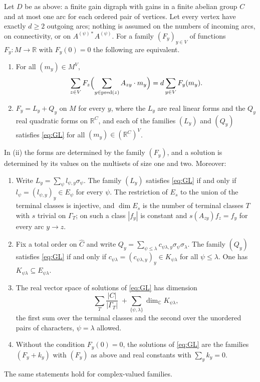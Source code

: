 \begin{theorem}\label{thm:vertexlaw}
Let $D$ be as above: a finite gain digraph with gains in a finite abelian group $C$ and at most one arc for each ordered pair of vertices. Let every vertex have exactly $d\ge2$ outgoing arcs; nothing is assumed on the numbers of incoming arcs, on connectivity, or on $A^{(\psi)*}A^{(\psi)}$. For a family $(F_y)_{y\in V}$ of functions $F_y\colon M\to\mathbb{R}$ with $F_y(0)=0$ the following are equivalent.
\begin{enumerate}
\item[(i)] For all $(m_y)\in M^V$,
\begin{equation}\label{eq:GL}
\sum_{z\in V}F_z\Bigl(\sum_{y\in\operatorname{pred}(z)}A_{zy}\cdot m_y\Bigr)=d\sum_{y\in V}F_y(m_y).
\end{equation}
\item[(ii)] $F_y=L_y+Q_y$ on $M$ for every $y$, where the $L_y$ are real linear forms and the $Q_y$ real quadratic forms on $\mathbb{R}^C$, and each of the families $(L_y)$ and $(Q_y)$ satisfies \eqref{eq:GL} for all $(m_y)\in(\mathbb{R}^C)^V$.
\end{enumerate}
In (ii) the forms are determined by the family $(F_y)$, and a solution is determined by its values on the multisets of size one and two. Moreover:
\begin{enumerate}
\item[(a)] Write $L_y=\sum_\psi l_{\psi,y}\sigma_\psi$. The family $(L_y)$ satisfies \eqref{eq:GL} if and only if $l_\psi=(l_{\psi,y})_y\in E_\psi$ for every $\psi$. The restriction of $E_s$ to the union of the terminal classes is injective, and $\dim E_s$ is the number of terminal classes $T$ with $s$ trivial on $\Gamma_T$; on such a class $|f_y|$ is constant and $s(A_{zy})f_z=f_y$ for every arc $y\to z$.
\item[(b)] Fix a total order on $\hat C$ and write $Q_y=\sum_{\psi\le\lambda}c_{\psi\lambda,y}\sigma_\psi\sigma_\lambda$. The family $(Q_y)$ satisfies \eqref{eq:GL} if and only if $c_{\psi\lambda}=(c_{\psi\lambda,y})_y\in K_{\psi\lambda}$ for all $\psi\le\lambda$. One has $K_{\psi\lambda}\subseteq E_{\psi\lambda}$.
\item[(c)] The real vector space of solutions of \eqref{eq:GL} has dimension
\[
\sum_{T}\frac{|C|}{|\Gamma_T|}\;+\sum_{\{\psi,\lambda\}}\dim_{\mathbb{C}}K_{\psi\lambda},
\]
the first sum over the terminal classes and the second over the unordered pairs of characters, $\psi=\lambda$ allowed.
\item[(d)] Without the condition $F_y(0)=0$, the solutions of \eqref{eq:GL} are the families $(F_y+k_y)$ with $(F_y)$ as above and real constants with $\sum_yk_y=0$.
\end{enumerate}
The same statements hold for complex-valued families.
\end{theorem}

